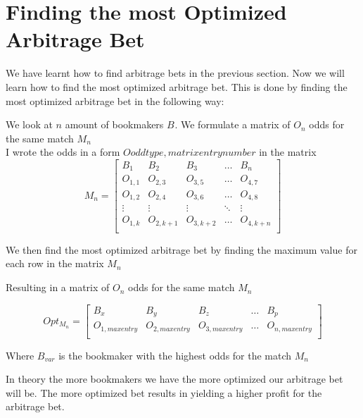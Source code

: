 
\section{Finding the most Optimized Arbitrage Bet}

We have learnt how to find arbitrage bets in the previous section. Now we will learn how to find the most optimized arbitrage bet. This is done by finding the most optimized arbitrage bet in the following way:

We look at $n$ amount of bookmakers $B_{}$. We formulate a matrix of $O_{n}$ odds for the same match $M_{n}$\\

I wrote the odds in a form $O{oddtype,matrixentrynumber}$ in the matrix\\

\begin{equation}
    M_{n} = \begin{bmatrix}
        B_{1} & B_{2} & B_{3} & \dots & B_{n} \\
        O_{1,1} & O_{2,3} & O_{3,5} & \dots & O_{4,7} \\
        O_{1,2} & O_{2,4} & O_{3,6} & \dots & O_{4,8} \\
        \vdots & \vdots & \vdots & \ddots & \vdots \\
        O_{1,k} & O_{2,k+1} & O_{3,k+2} & \dots & O_{4,k+n} \\
    \end{bmatrix}
\end{equation}

We then find the most optimized arbitrage bet by finding the maximum value for each row in the matrix $M_{n}$

Resulting in a matrix of $O_{n}$ odds for the same match $M_{n}$

\begin{equation}
    Opt_{M_{n}} = \begin{bmatrix}
        B_{x} & B_{y} & B_{z} & \dots & B_{p} \\
        O_{1,maxentry} & O_{2,maxentry} & O_{3,maxentry} & \dots & O_{n,maxentry} \\
    \end{bmatrix}
\end{equation}

Where $B_{var}$ is the bookmaker with the highest odds for the match $M_{n}$

In theory the more bookmakers we have the more optimized our arbitrage bet will be. The more optimized bet results in yielding a higher profit for the arbitrage bet.\\

